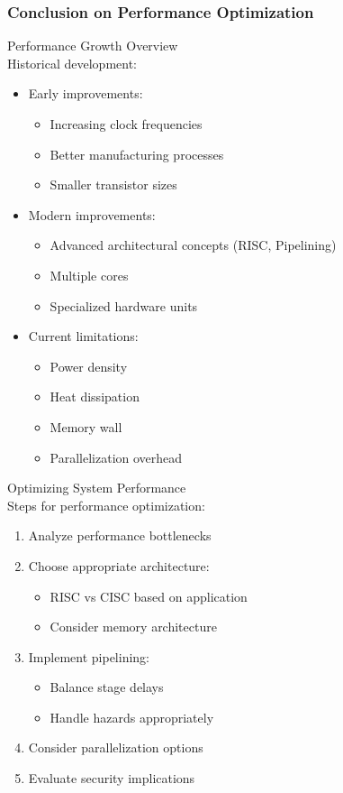 \subsubsection{Conclusion on Performance Optimization}



\begin{concept}{Performance Growth Overview}\\
Historical development:
\begin{itemize}
  \item Early improvements:
    \begin{itemize}
      \item Increasing clock frequencies
      \item Better manufacturing processes
      \item Smaller transistor sizes
    \end{itemize}
  \item Modern improvements:
    \begin{itemize}
      \item Advanced architectural concepts (RISC, Pipelining)
      \item Multiple cores
      \item Specialized hardware units
    \end{itemize}
  \item Current limitations:
    \begin{itemize}
      \item Power density
      \item Heat dissipation
      \item Memory wall
      \item Parallelization overhead
    \end{itemize}
\end{itemize}
\end{concept}

\begin{KR}{Optimizing System Performance}\\
Steps for performance optimization:
\begin{enumerate}
  \item Analyze performance bottlenecks
  \item Choose appropriate architecture:
    \begin{itemize}
      \item RISC vs CISC based on application
      \item Consider memory architecture
    \end{itemize}
  \item Implement pipelining:
    \begin{itemize}
      \item Balance stage delays
      \item Handle hazards appropriately
    \end{itemize}
  \item Consider parallelization options
  \item Evaluate security implications
\end{enumerate}
\end{KR}

